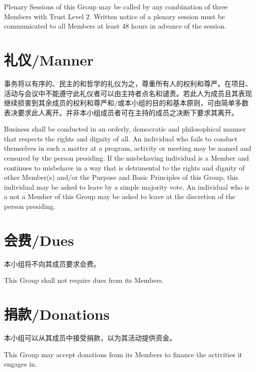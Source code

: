 \documentclass[12pt]{aspasia-constitution}
\begin{document}
	Plenary Sessions of this Group may be called by any combination of three Members with Trust Level 2. Written notice of a plenary session must be communicated to all Members at least 48 hours in advance of the session.
	
	\section{礼仪/Manner} \label{sec:manners}
	
	事务将以有序的、民主的和哲学的礼仪为之，尊重所有人的权利和尊严。在项目、活动与会议中不能遵守此礼仪者可以由主持者点名和谴责。若此人为成员且其表现继续损害到其余成员的权利和尊严和/或本小组的目的和基本原则，可由简单多数表决要求此人离开。并非本小组成员者可在主持的成员之决断下要求其离开。
	
	Business shall be conducted in an orderly, democratic and philosophical manner that respects the rights and dignity of all. An individual who fails to conduct themselves in such a matter at a program, activity or meeting may be named and censured by the person presiding. If the misbehaving individual is a Member and continues to misbehave in a way that is detrimental to the rights and dignity of other Member(s) and/or the Purpose and Basic Principles of this Group, this individual may be asked to leave by a simple majority vote. An individual who is a not a Member of this Group may be asked to leave at the discretion of the person presiding.
	
	 \label{art:dues}
	
	\section{会费/Dues} \label{sec:dues}
	
	本小组将不向其成员要求会费。
	
	This Group shall not require dues from its Members.
	
	\section{捐款/Donations} \label{sec:donations}
	
	本小组可以从其成员中接受捐款，以为其活动提供资金。
	
	This Group may accept donations from its Members to finance the activities it engages in.
	
	 \label{art:secondary}
	
\end{document}
